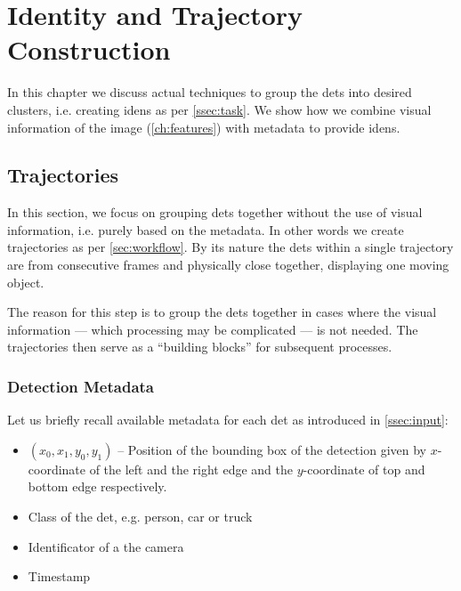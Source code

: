 \chapter{Identity and Trajectory Construction}


In this chapter we discuss actual techniques to group the \glspl{det} into
desired clusters, i.e. creating \glspl{iden} as per \autoref{ssec:task}.
We show how we combine visual information of the image
(\autoref{ch:features}) with metadata to provide \glspl{iden}.

\section{Trajectories}

In this section, we focus on grouping \glspl{det} together without the use of visual information, i.e. purely based on the metadata. In other words we create trajectories as per \autoref{sec:workflow}. By its nature the \glspl{det} within a single trajectory are from consecutive frames and physically close together, displaying one moving object.

The reason for this step is to group the \glspl{det} together in cases
where the visual information --- which processing may be complicated --- is not
needed. The trajectories then serve as a ``building blocks'' for subsequent
processes.



\subsection{Detection Metadata}

Let us briefly recall available metadata for each \gls{det} as introduced in
\autoref{ssec:input}:

\begin{itemize}
    \item $(x_0, x_1, y_0, y_1)$ -- Position of the bounding box of the detection given by $x$-coordinate of the left and the right edge and the $y$-coordinate of top and bottom edge respectively.
    \item Class of the \gls{det}, e.g. person, car or truck
    \item Identificator of a the camera
    \item Timestamp
\end{itemize}

